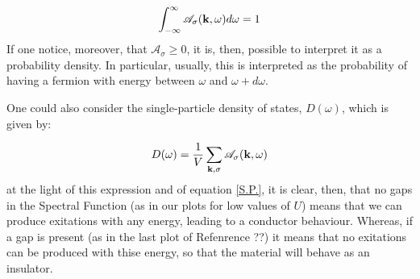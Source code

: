 \begin{equation}
\int_{-\infty}^\infty \mathscr{A}_\sigma(\bold{k},\omega)d\omega = 1
\end{equation}
If one notice, moreover, that $\mathscr{A}_\sigma \geq 0$, it is, then, possible to interpret
it as a probability density. In particular, usually, this is interpreted as the probability of having a fermion with energy between $\omega$ and $\omega + d\omega$.

One could also consider the single-particle density of states, $D(\omega)$, which is given by:

\begin{equation}\label{D.o.S.}
D(\omega) = \frac{1}{V}\sum_{\bold{k},\sigma} \mathscr{A}_\sigma(\bold{k},\omega)
\end{equation}
at the light of this expression and of equation \eqref{S.P.}, it is clear, then, that no gaps in the Spectral Function (as in our plots for low values of $U$) means that we can produce exitations with any energy, leading to a conductor behaviour. Whereas, if a gap is present (as in the last plot of Refenrence ??) it means that no exitations can be produced with thise energy, so that the material will behave as an insulator.


\clearpage
